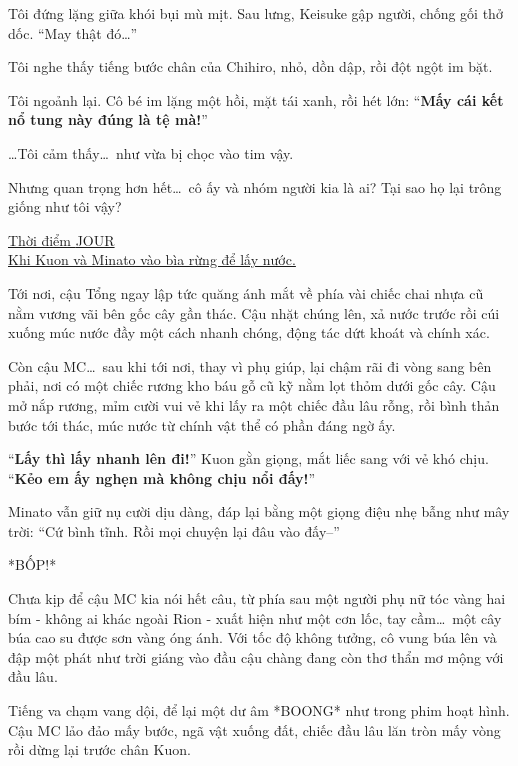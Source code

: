 \documentclass[../main.tex]{subfiles}
\begin{document}
Tôi đứng lặng giữa khói bụi mù mịt.
Sau lưng, Keisuke gập người, chống gối thở dốc. ``May thật đó\dots''

Tôi nghe thấy tiếng bước chân của Chihiro, nhỏ, dồn dập, rồi đột ngột im bặt.

Tôi ngoảnh lại. Cô bé im lặng một hồi, mặt tái xanh, rồi hét lớn: ``\textbf{Mấy cái kết nổ tung này đúng là tệ mà!}''

\dots Tôi cảm thấy\dots\ như vừa bị chọc vào tim vậy.

Nhưng quan trọng hơn hết\dots\ cô ấy và nhóm người kia là ai? Tại sao họ lại trông giống như tôi vậy?

\begin{center}
  \uline{Thời điểm {\flaregothic JOUR }\\ Khi Kuon và Minato vào bìa rừng để lấy nước.}
  \pov{-}
\end{center}

Tới nơi, cậu Tổng ngay lập tức quăng ánh mắt về phía vài chiếc chai nhựa cũ nằm vương vãi bên gốc cây gần thác. Cậu nhặt chúng lên, xả nước trước rồi cúi xuống múc nước đầy một cách nhanh chóng, động tác dứt khoát và chính xác.

Còn cậu MC\dots\ sau khi tới nơi, thay vì phụ giúp, lại chậm rãi đi vòng sang bên phải, nơi có một chiếc rương kho báu gỗ cũ kỹ nằm lọt thỏm dưới gốc cây. Cậu mở nắp rương, mỉm cười vui vẻ khi lấy ra một chiếc đầu lâu rỗng, rồi bình thản bước tới thác, múc nước từ chính vật thể có phần đáng ngờ ấy.

``\textbf{Lấy thì lấy nhanh lên đi!}'' Kuon gằn giọng, mắt liếc sang với vẻ khó chịu. ``\textbf{Kẻo em ấy nghẹn mà không chịu nổi đấy!}''

Minato vẫn giữ nụ cười dịu dàng, đáp lại bằng một giọng điệu nhẹ bẫng như mây trời: ``Cứ bình tĩnh. Rồi mọi chuyện lại đâu vào đấy--''

*BỐP!*

Chưa kịp để cậu MC kia nói hết câu, từ phía sau một người phụ nữ tóc vàng hai bím - không ai khác ngoài Rion - xuất hiện như một cơn lốc, tay cầm\dots\ một cây búa cao su được sơn vàng óng ánh. Với tốc độ không tưởng, cô vung búa lên và đập một phát như trời giáng vào đầu cậu chàng đang còn thơ thẩn mơ mộng với đầu lâu.


Tiếng va chạm vang dội, để lại một dư âm *BOONG* như trong phim hoạt hình. Cậu MC lảo đảo mấy bước, ngã vật xuống đất, chiếc đầu lâu lăn tròn mấy vòng rồi dừng lại trước chân Kuon.
\end{document}
